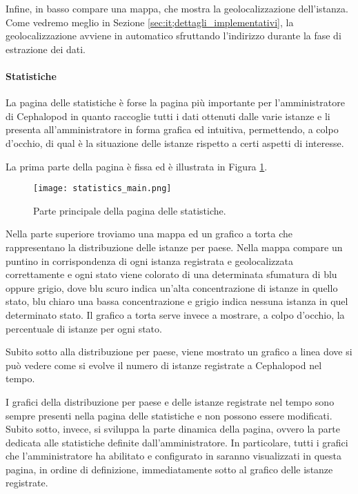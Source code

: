         	Infine, in basso compare una mappa, che mostra la geolocalizzazione dell'istanza. Come vedremo meglio in Sezione \ref{sec:it;dettagli_implementativi}, la geolocalizzazione avviene in automatico sfruttando l'indirizzo  durante la fase di estrazione dei dati.
        	
        	\paragraph{Statistiche}La pagina delle statistiche è forse la pagina più importante per l'amministratore di Cephalopod in quanto raccoglie tutti i dati ottenuti dalle varie istanze e li presenta all'amministratore in forma grafica ed intuitiva, permettendo, a colpo d'occhio, di qual è la situazione delle istanze rispetto a certi aspetti di interesse.
        	
        	La prima parte della pagina è fissa ed è illustrata in Figura \ref{fig:statistics_main}.
        	
        	\begin{figure}[h!]
        		\begin{center}
        			\texttt{[image: statistics\_main.png]}
        		\end{center}
        		\caption[Statistiche principali]{Parte principale della pagina delle statistiche.}
        		\label{fig:statistics_main}
        	\end{figure}
        	
        	Nella parte superiore troviamo una mappa ed un grafico a torta che rappresentano la distribuzione delle istanze per paese. Nella mappa compare un puntino in corrispondenza di ogni istanza registrata e geolocalizzata correttamente e ogni stato viene colorato di una determinata sfumatura di blu oppure grigio, dove blu scuro indica un'alta concentrazione di istanze in quello stato, blu chiaro una bassa concentrazione e grigio indica nessuna istanza in quel determinato stato. Il grafico a torta serve invece a mostrare, a colpo d'occhio, la percentuale di istanze per ogni stato.
        	
        	Subito sotto alla distribuzione per paese, viene mostrato un grafico a linea dove si può vedere come si evolve il numero di istanze registrate a Cephalopod nel tempo.
        	
        	I grafici della distribuzione per paese e delle istanze registrate nel tempo sono sempre presenti nella pagina delle statistiche e non possono essere modificati. Subito sotto, invece, si sviluppa la parte dinamica della pagina, ovvero la parte dedicata alle statistiche definite dall'amministratore. In particolare, tutti i grafici che l'amministratore ha abilitato e configurato in  saranno visualizzati in questa pagina, in ordine di definizione, immediatamente sotto al grafico delle istanze registrate.
        	
